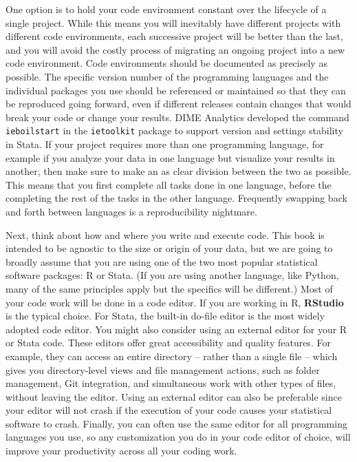 One option is to hold your code environment constant
over the lifecycle of a single project.
While this means you will inevitably have different projects
with different code environments, each successive project will be better than the last,
and you will avoid the costly process of migrating an ongoing project
into a new code environment.
Code environments should be documented as precisely as possible.
The specific version number of the programming languages and the individual packages you use
should be referenced or maintained so that they can be reproduced going forward,
even if different releases contain changes that would break your code
or change your results.
DIME Analytics developed the command \texttt{ieboilstart} in the \texttt{ietoolkit} package
to support version and settings stability in Stata.
If your project requires more than one programming language,
for example if you analyze your data in one language but visualize your results in another,
then make sure to make an as clear division between the two as possible.
This means that you first complete all tasks done in one language,
before the completing the rest of the tasks in the other language.
Frequently swapping back and forth between languages is a reproducibility nightmare.

Next, think about how and where you write and execute code.
This book is intended to be agnostic to the size or origin of your data,
but we are going to broadly assume that you are using
one of the two most popular statistical software packages: R or Stata.
(If you are using another language, like Python,
many of the same principles apply but the specifics will be different.)
Most of your code work will be done in a code editor.
If you are working in R, \textbf{RStudio} is the typical choice.
For Stata, the built-in do-file editor is the most widely adopted code editor.
You might also consider using an external editor for your R or Stata code.
These editors offer great accessibility and quality features.
For example, they can access an entire directory -- rather than a single file --
which gives you directory-level views and file management actions,
such as folder management, Git integration,
and simultaneous work with other types of files, without leaving the editor.
Using an external editor can also be preferable since your editor will not crash
if the execution of your code causes your statistical software to crash.
Finally, you can often use the same editor for all programming languages you use,
so any customization you do in your code editor of choice, 
will improve your productivity across all your coding work.

